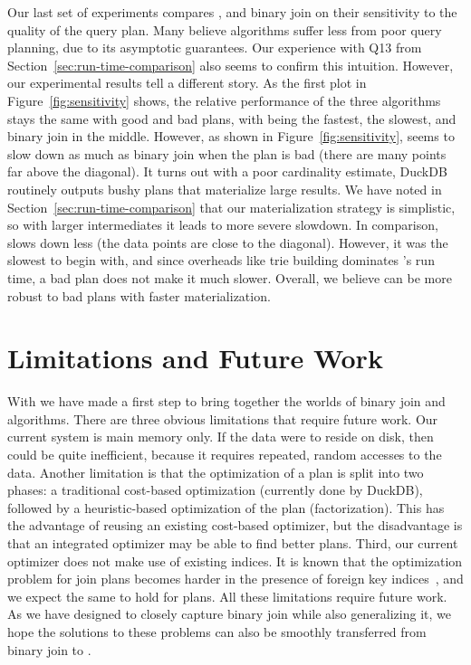 Our last set of experiments compares \FJ, \GJ and binary join 
  on their sensitivity to the quality of the query plan.
Many believe \WCOJ algorithms suffer less from poor query planning,
  due to its asymptotic guarantees.
Our experience with Q13 from Section~\ref{sec:run-time-comparison}
  also seems to confirm this intuition.
However, our experimental results tell a different story.
As the first plot in Figure~\ref{fig:sensitivity} shows, 
  the relative performance of the three algorithms stays 
  the same with good and bad plans, with \FJ being the fastest,
  \GJ the slowest, and binary join in the middle.
However, as shown in Figure~\ref{fig:sensitivity},
  \FJ seems to slow down as much as binary join 
  when the plan is bad (there are many points far above the diagonal).
It turns out with a poor cardinality estimate, 
  DuckDB routinely outputs bushy plans that materialize large results.
We have noted in Section~\ref{sec:run-time-comparison} that 
  our materialization strategy is simplistic, 
  so with larger intermediates it leads to more severe slowdown.
In comparison, \GJ slows down less (the data points are close to the diagonal).
However, it was the slowest to begin with,
  and since overheads like trie building dominates \GJ's run time, 
  a bad plan does not make it much slower.
Overall, we believe \FJ can be more robust to bad plans with 
  faster materialization.

  \section{Limitations and Future Work}\label{sec:discussion}

  With \FJ we have made a first step to bring together 
  the worlds of binary join and \WCOJ algorithms.
  There are three obvious limitations that require future work.  Our
  current system is main memory only.  If the data were to reside on
  disk, then \COLT could be quite inefficient, because it requires
  repeated, random accesses to the data.  Another limitation is that the
  optimization of a \FJ plan is split into two phases: a
  traditional cost-based optimization (currently done by DuckDB),
  followed by a heuristic-based optimization of the \FJ plan
  (factorization).  This has the advantage of reusing an existing
  cost-based optimizer, but the disadvantage is that an integrated
  optimizer may be able to find better plans.  Third, our current
  optimizer does not make use of existing indices.  It is known that the
  optimization problem for join plans becomes harder in the presence of
  foreign key indices~\cite{DBLP:journals/pvldb/LeisGMBK015}, and we
  expect the same to hold for \FJ plans.  All these limitations require
  future work.  As we have designed \FJ to closely capture binary join
  while also generalizing it, we hope the solutions to these problems
  can also be smoothly transferred from binary join to \FJ.
  
